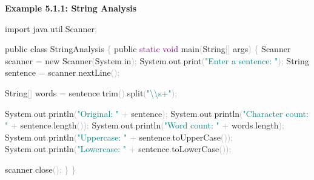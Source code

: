 \documentclass[
  justified,
  openright,
]{tufte-book}
\newcommand{\BuiltInTok}[1]{#1}
\newcommand{\DataTypeTok}[1]{\textcolor{Purple}{#1}}
\newcommand{\FunctionTok}[1]{\textcolor{BrandBlue}{#1}}
\newcommand{\ImportTok}[1]{\textcolor{BrandAccent}{#1}}
\newcommand{\KeywordTok}[1]{\textcolor{BrandBlue}{#1}}
\newcommand{\NormalTok}[1]{#1}
\newcommand{\OperatorTok}[1]{\textcolor{DarkGray}{#1}}
\newcommand{\SpecialCharTok}[1]{\textcolor{Teal}{#1}}
\newcommand{\StringTok}[1]{\textcolor{Teal}{#1}}
\newenvironment{Shaded}{%
  \begin{snugshade}
}{%
  \end{snugshade}
}
\begin{document}
\textbf{Example 5.1.1: String Analysis}

\begin{Shaded}
\begin{Highlighting}[]
\KeywordTok{import} \ImportTok{java}\OperatorTok{.}\ImportTok{util}\OperatorTok{.}\ImportTok{Scanner}\OperatorTok{;}

\KeywordTok{public} \KeywordTok{class}\NormalTok{ StringAnalysis }\OperatorTok{\{}
    \KeywordTok{public} \DataTypeTok{static} \DataTypeTok{void} \FunctionTok{main}\OperatorTok{(}\BuiltInTok{String}\OperatorTok{[]}\NormalTok{ args}\OperatorTok{)} \OperatorTok{\{}
        \BuiltInTok{Scanner}\NormalTok{ scanner }\OperatorTok{=} \KeywordTok{new} \BuiltInTok{Scanner}\OperatorTok{(}\BuiltInTok{System}\OperatorTok{.}\FunctionTok{in}\OperatorTok{);}
        \BuiltInTok{System}\OperatorTok{.}\FunctionTok{out}\OperatorTok{.}\FunctionTok{print}\OperatorTok{(}\StringTok{"Enter a sentence: "}\OperatorTok{);}
        \BuiltInTok{String}\NormalTok{ sentence }\OperatorTok{=}\NormalTok{ scanner}\OperatorTok{.}\FunctionTok{nextLine}\OperatorTok{();}

        \BuiltInTok{String}\OperatorTok{[]}\NormalTok{ words }\OperatorTok{=}\NormalTok{ sentence}\OperatorTok{.}\FunctionTok{trim}\OperatorTok{().}\FunctionTok{split}\OperatorTok{(}\StringTok{"}\SpecialCharTok{\textbackslash{}\textbackslash{}}\StringTok{s+"}\OperatorTok{);}

        \BuiltInTok{System}\OperatorTok{.}\FunctionTok{out}\OperatorTok{.}\FunctionTok{println}\OperatorTok{(}\StringTok{"Original: "} \OperatorTok{+}\NormalTok{ sentence}\OperatorTok{);}
        \BuiltInTok{System}\OperatorTok{.}\FunctionTok{out}\OperatorTok{.}\FunctionTok{println}\OperatorTok{(}\StringTok{"Character count: "} \OperatorTok{+}\NormalTok{ sentence}\OperatorTok{.}\FunctionTok{length}\OperatorTok{());}
        \BuiltInTok{System}\OperatorTok{.}\FunctionTok{out}\OperatorTok{.}\FunctionTok{println}\OperatorTok{(}\StringTok{"Word count: "} \OperatorTok{+}\NormalTok{ words}\OperatorTok{.}\FunctionTok{length}\OperatorTok{);}
        \BuiltInTok{System}\OperatorTok{.}\FunctionTok{out}\OperatorTok{.}\FunctionTok{println}\OperatorTok{(}\StringTok{"Uppercase: "} \OperatorTok{+}\NormalTok{ sentence}\OperatorTok{.}\FunctionTok{toUpperCase}\OperatorTok{());}
        \BuiltInTok{System}\OperatorTok{.}\FunctionTok{out}\OperatorTok{.}\FunctionTok{println}\OperatorTok{(}\StringTok{"Lowercase: "} \OperatorTok{+}\NormalTok{ sentence}\OperatorTok{.}\FunctionTok{toLowerCase}\OperatorTok{());}

\NormalTok{        scanner}\OperatorTok{.}\FunctionTok{close}\OperatorTok{();}
    \OperatorTok{\}}
\OperatorTok{\}}
\end{Highlighting}
\end{Shaded}
\end{document}
